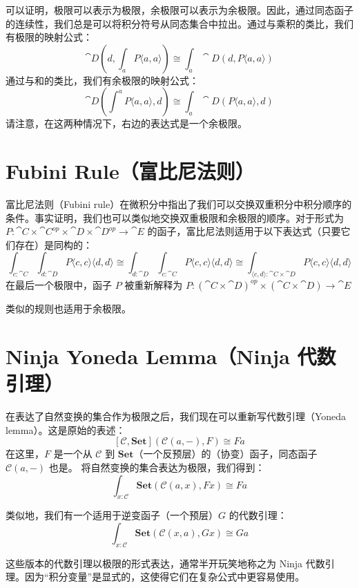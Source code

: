 \documentclass[DaoFP]{subfiles}
\begin{document}
 可以证明，极限可以表示为极限，余极限可以表示为余极限。因此，通过同态函子的连续性，我们总是可以将积分符号从同态集合中拉出。通过与乘积的类比，我们有极限的映射公式：
 \[\cat D\left(d, \int_a P\langle a, a \rangle \right) \cong \int_a \cat D(d, P\langle a, a \rangle) \]
 通过与和的类比，我们有余极限的映射公式：
 \[\cat D\left( \int^a P\langle a, a \rangle , d \right) \cong \int_a \cat D(P\langle a, a \rangle, d) \]
 请注意，在这两种情况下，右边的表达式是一个余极限。

 \section{Fubini Rule（富比尼法则）}

 富比尼法则（Fubini rule）在微积分中指出了我们可以交换双重积分中积分顺序的条件。事实证明，我们也可以类似地交换双重极限和余极限的顺序。对于形式为 $P \colon \cat C \times \cat C^{op} \times \cat D \times \cat D^{op} \to \cat E$ 的函子，富比尼法则适用于以下表达式（只要它们存在）是同构的：
 \[ \int_{c \colon \cat C} \int_{d \colon \cat D} P\langle c, c \rangle \langle d, d \rangle \cong  \int_{d \colon \cat D} \int_{c \colon \cat C} P\langle c, c \rangle \langle d, d \rangle \cong  \int_{\langle c, d \rangle \colon \cat C \times \cat D}  P\langle c, c \rangle \langle d, d \rangle \]
 在最后一个极限中，函子 $P$ 被重新解释为 $P \colon (\cat C  \times \cat D)^{op} \times (\cat C \times \cat D)\to \cat E$

 类似的规则也适用于余极限。

 \section{Ninja Yoneda Lemma（Ninja 代数引理）}

 在表达了自然变换的集合作为极限之后，我们现在可以重新写代数引理（Yoneda lemma）。这是原始的表述：
 \[ [\mathcal{C}, \mathbf{Set}]( \mathcal{C}(a, -), F) \cong F a \]
 在这里，$F$ 是一个从 $\mathcal{C}$ 到 $\mathbf{Set}$（一个反预层）的（协变）函子，同态函子 $\mathcal{C}(a, -)$ 也是。
 将自然变换的集合表达为极限，我们得到：
 \[ \int_{x \colon \mathcal{C}} \mathbf{Set} (\mathcal{C}(a, x), F x) \cong F a \]

 类似地，我们有一个适用于逆变函子（一个预层）$G$ 的代数引理：
 \[ \int_{x \colon \mathcal{C}} \mathbf{Set} (\mathcal{C}(x, a), G x) \cong G a \]

 这些版本的代数引理以极限的形式表达，通常半开玩笑地称之为 Ninja 代数引理。因为“积分变量”是显式的，这使得它们在复杂公式中更容易使用。
\end{document}
